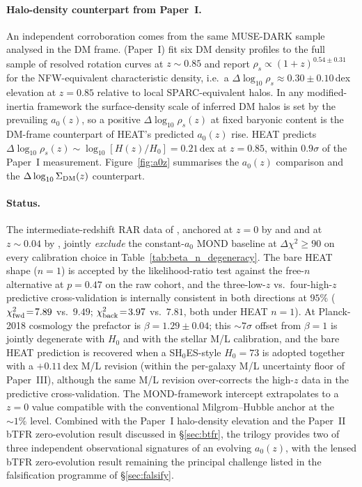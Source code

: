 \documentclass[twocolumn,letterpaper]{aastex631}
\newcommand{\azero}{a_0}
\begin{document}
\paragraph{Halo-density counterpart from Paper~I.}  An
independent corroboration comes from the same MUSE-DARK sample
analysed in the DM frame.  \citet{Ciocan2026Halo} (Paper~I) fit
six DM density profiles to the full sample of resolved
rotation curves at $z\!\sim\!0.85$ and report
$\rho_{s}\!\propto\!(1\!+\!z)^{0.54\pm 0.31}$ for the NFW-equivalent
characteristic density, i.e.\ a $\Delta\log_{10}\rho_{s}
\!\approx\!0.30\!\pm\!0.10$\,dex elevation at $z\!=\!0.85$
relative to local SPARC-equivalent halos.  In any
modified-inertia framework the surface-density scale of inferred
DM halos is set by the prevailing $\azero(z)$, so a positive
$\Delta\log_{10}\rho_{s}(z)$ at fixed baryonic content is the
DM-frame counterpart of HEAT's predicted $\azero(z)$ rise.
HEAT predicts
$\Delta\log_{10}\rho_{s}(z)\!\sim\!\log_{10}[H(z)/H_{0}]
\!=\!0.21$\,dex at $z\!=\!0.85$, within $0.9\sigma$ of the
Paper~I measurement.  Figure~\ref{fig:a0z} summarises the
$\azero(z)$ comparison and the
$\Delta\log_{10}\Sigma_{\rm DM}(z)$ counterpart.

\paragraph{Status.}  The intermediate-redshift RAR data of
\citet{Ciocan2026RAR}, anchored at $z\!=\!0$ by
\citet{Desmond2023} and \citet{McGaugh2016} and at
$z\!\sim\!0.04$ by \citet{Varasteanu2025}, jointly
\emph{exclude} the constant-$\azero$ MOND baseline at
$\Delta\chi^{2}\!\geq\!90$ on every calibration choice in
Table~\ref{tab:beta_n_degeneracy}.  The bare HEAT shape
($n\!=\!1$) is accepted by the likelihood-ratio test against
the free-$n$ alternative at $p\!=\!0.47$ on the raw cohort,
and the three-low-$z$ vs.\ four-high-$z$ predictive
cross-validation is internally consistent in both directions
at $95\%$ ($\chi^{2}_{\rm fwd}\!=\!7.89$ vs.\ $9.49$;
$\chi^{2}_{\rm back}\!=\!3.97$ vs.\ $7.81$, both under HEAT
$n\!=\!1$).  At Planck-2018 cosmology the prefactor is
$\beta\!=\!1.29\!\pm\!0.04$; this $\sim\!7\sigma$ offset from
$\beta\!=\!1$ is jointly degenerate with $H_{0}$ and with the
stellar M/L calibration, and the bare HEAT prediction is
recovered when a SH$_{0}$ES-style $H_{0}\!=\!73$ is adopted
together with a $+0.11$\,dex M/L revision (within the
per-galaxy M/L uncertainty floor of Paper~III), although the
same M/L revision over-corrects the high-$z$ data in the
predictive cross-validation.  The MOND-framework
intercept extrapolates to a $z\!=\!0$ value compatible with the
conventional Milgrom--Hubble anchor at the $\sim 1\%$ level.
Combined with the Paper~I halo-density elevation and the
Paper~II bTFR zero-evolution result discussed in
\S\ref{sec:btfr}, the trilogy provides two of three independent
observational signatures of an evolving $\azero(z)$, with the
lensed bTFR zero-evolution result remaining the principal
challenge listed in the falsification programme of
\S\ref{sec:falsify}.
\end{document}

